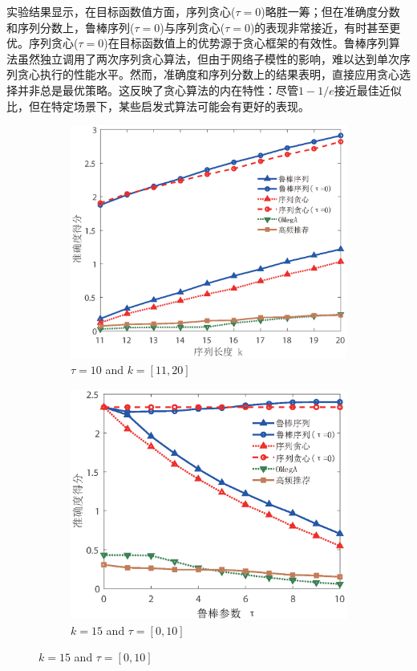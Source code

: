 实验结果显示，在目标函数值方面，序列贪心($\tau=0$)略胜一筹；但在准确度分数和序列分数上，鲁棒序列($\tau=0$)与序列贪心($\tau=0$)的表现非常接近，有时甚至更优。序列贪心($\tau=0$)在目标函数值上的优势源于贪心框架的有效性。鲁棒序列算法虽然独立调用了两次序列贪心算法，但由于网络子模性的影响，难以达到单次序列贪心执行的性能水平。然而，准确度和序列分数上的结果表明，直接应用贪心选择并非总是最优策略。这反映了贪心算法的内在特性：尽管$1-1/e$接近最佳近似比，但在特定场景下，某些启发式算法可能会有更好的表现。
\begin{figure}[H]
    \centering
    \begin{subfigure}{0.45\textwidth}
        \includegraphics[width=\linewidth]{figure/rosenets/rec/rec-acc1}
        \caption{$\tau=10$ and $k=[11,20]$}
        \label{fig:rec-acc}
    \end{subfigure}
    \hfill
    \begin{subfigure}{0.45\textwidth}
        \includegraphics[width=\linewidth]{figure/rosenets/rec/rec-acc1-t}
        \caption{$k=15$ and $\tau=[0,10]$}
        \label{fig:rec-acc-t}
    \end{subfigure}


\end{figure}
